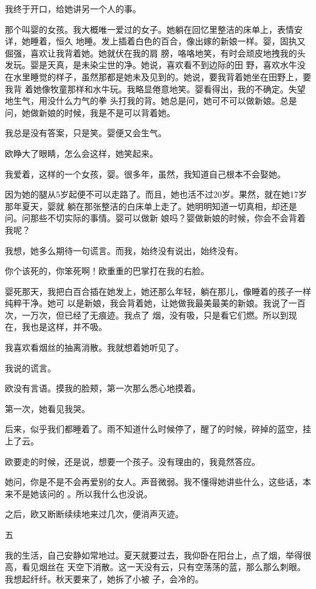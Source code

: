 \documentclass[12pt,a4paper]{article}
\newcommand{\subpart}[1]{
	\begingroup \par
	\vspace{1ex} \centering #1
	\par \endgroup \nopagebreak[4]
}
\begin{document}
		我终于开口，给她讲另一个人的事。

		那个叫婴的女孩。我大概唯一爱过的女子。她躺在回忆里整洁的床单上，表情安详，她睡着，恒久
	地睡。发上插着白色的百合，像出嫁的新娘一样。婴，固执又倔强，喜欢让我背着她。她就伏在我的肩
	膀，咯咯地笑，有时会顽皮地拽我的头发玩。婴是天真，是未染尘世的净。她说，喜欢看不到边际的田
	野，喜欢水牛没在水里睡觉的样子，虽然那都是她未及见到的。她说，要我背着她坐在田野上，要我背
	着她像牧童那样和水牛玩。我略显倦意地笑。婴看得出，我的不确定。失望地生气，用没什么力气的拳
	头打我的背。她总是问，她可不可以做新娘。总是问，她做新娘的时候，我是不是可以背着她。

		我总是没有答案，只是笑。婴便又会生气。\par
		欧睁大了眼睛，怎么会这样，她笑起来。\par
		我爱着，这样的一个女孩，婴。很多年，虽然，我知道自己根本不会娶她。

		因为她的腿从5岁起便不可以走路了。而且，她也活不过20岁。果然，就在她17岁那年夏天，婴就
	躺在那张整洁的白床单上走了。她明明知道一切真相，却还是问。问那些不切实际的事情。婴可以做新
	娘吗？婴做新娘的时候，你会不会背着我呢？

		我想，她多么期待一句谎言。而我，始终没有说出，始终没有。\par
		你个该死的，你笨死啊！欧重重的巴掌打在我的右脸。

		婴死那天，我把白百合插在她发上，她还那么年轻，躺在那儿，像睡着的孩子一样纯粹干净。她可
	以是新娘，我会背着她，让她做我最美最美的新娘。我说了一百次，一万次，但已经了无痕迹。我点了
	烟，没有吸，只是看它们燃。所以到现在，我也是这样，并不吸。

		我喜欢看烟丝的抽离消散。我就想着她听见了。\par
		我说的谎言。\par
		欧没有言语。摸我的脸颊，第一次那么悉心地摸着。\par
		第一次，她看见我哭。\par
		后来，似乎我们都睡着了。雨不知道什么时候停了，醒了的时候，碎掉的蓝空，挂上了云。\par
		欧要走的时候，还是说，想要一个孩子。没有理由的，我竟然答应。

		她问，你是不是不会再爱别的女人。声音微弱。我不懂得她讲些什么，这些话，本来不是她该问的
	。所以我什么也没说。

		之后，欧又断断续续地来过几次，便消声灭迹。

		\subpart{五}

		我的生活，自己安静如常地过。夏天就要过去，我仰卧在阳台上，点了烟，举得很高，看见烟丝在
	天空下消散。这一天没有云，只有空荡荡的蓝，那么那么刺眼。我想起纤纤。秋天要来了，她拆了小被
	子，会冷的。
\end{document}

